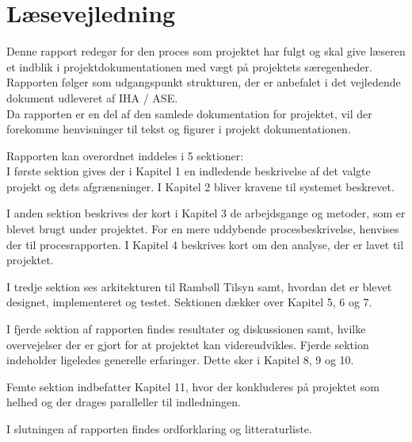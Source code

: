 \chapter*{Læsevejledning}
Denne rapport redegør for den proces som projektet har fulgt og skal give læseren et indblik i projektdokumentationen med vægt på projektets særegenheder. Rapporten følger som udgangspunkt strukturen, der er anbefalet i det vejledende dokument udleveret af IHA / ASE.\\
Da rapporten er en del af den samlede dokumentation for projektet, vil der forekomme
henvisninger til tekst og figurer i projekt dokumentationen.


Rapporten kan overordnet inddeles i 5 sektioner:\\
I første sektion gives der i Kapitel 1 en indledende beskrivelse af det valgte projekt og
dets afgrænsninger. I Kapitel 2 bliver kravene til systemet beskrevet.

I anden sektion beskrives der kort i Kapitel 3 de arbejdsgange og metoder, som er blevet brugt
under projektet. For en mere uddybende procesbeskrivelse, henvises der til procesrapporten.
I Kapitel 4 beskrives kort om den analyse, der er lavet til projektet.

I tredje sektion ses arkitekturen til Rambøll Tilsyn samt, hvordan det er blevet designet, implementeret og testet. 
Sektionen dækker over Kapitel 5, 6 og 7.

I fjerde sektion af rapporten findes resultater og diskussionen samt, hvilke overvejelser
der er gjort for at projektet kan videreudvikles. Fjerde sektion indeholder ligeledes generelle erfaringer. 
Dette sker i Kapitel 8, 9 og 10.

Femte sektion indbefatter Kapitel 11, hvor der konkluderes på projektet som helhed og
der drages paralleller til indledningen.

I slutningen af rapporten findes ordforklaring og litteraturliste.

